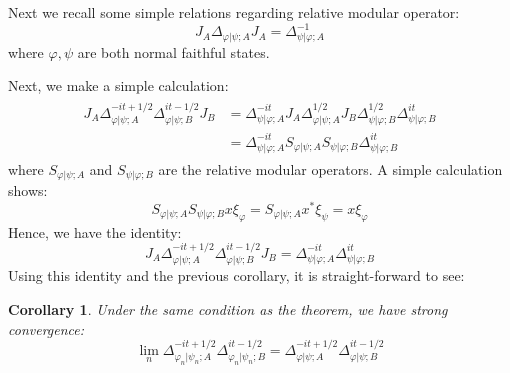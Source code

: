 \documentclass[a4paper,11pt]{article}
\newtheorem{corollary}[theorem]{Corollary}
\theoremstyle{definition}
\begin{document}
Next we recall some simple relations regarding relative modular operator:
\begin{equation}
    J_A\Delta_{\varphi|\psi;A}J_A = \Delta^{-1}_{\psi|\varphi;A}
\end{equation}
where $\varphi,\psi$ are both normal faithful states.

Next, we make a simple calculation:
\begin{align}
    \begin{split}
        J_A \Delta^{-it + 1/2}_{\varphi|\psi;A}\Delta^{it-1/2}_{\varphi|\psi;B} J_B &= \Delta^{-it}_{\psi|\varphi;A} J_A\Delta^{1/2}_{\varphi|\psi;A}J_B\Delta^{1/2}_{\psi|\varphi;B}\Delta_{\psi|\varphi;B}^{it}
        \\&=\Delta^{-it}_{\psi|\varphi;A}S_{\varphi|\psi;A}S_{\psi|\varphi;B}\Delta^{it}_{\psi|\varphi;B}
    \end{split}
\end{align}
where $S_{\varphi|\psi;A}$ and $S_{\psi|\varphi;B}$ are the relative modular operators. A simple calculation shows:
\begin{equation}
    S_{\varphi|\psi;A}S_{\psi|\varphi;B}x\xi_{\varphi} = S_{\varphi|\psi;A}x^*\xi_{\psi} = x\xi_{\varphi}
\end{equation}
Hence, we have the identity:
\begin{equation}
    J_A\Delta^{-it+1/2}_{\varphi|\psi;A}\Delta^{it-1/2}_{\varphi|\psi;B}J_B = \Delta^{-it}_{\psi|\varphi;A}\Delta^{it}_{\psi|\varphi;B}
\end{equation}
Using this identity and the previous corollary, it is straight-forward to see:
\begin{corollary}
    Under the same condition as the theorem, we have strong convergence:
    \begin{equation}
        \lim_n\Delta^{-it + 1/2}_{\varphi_n|\psi_n;A}\Delta^{it-1/2}_{\varphi_n|\psi_n;B} = \Delta^{-it + 1/2}_{\varphi|\psi;A}\Delta^{it-1/2}_{\varphi|\psi;B}
    \end{equation}
\end{corollary}
\end{document}
